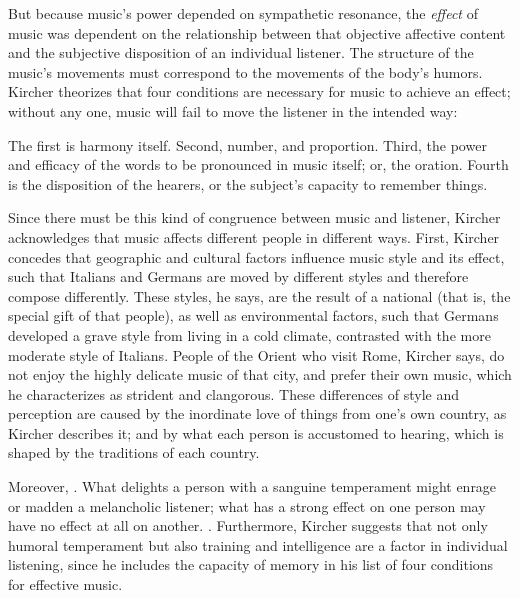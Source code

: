 But because music's power depended on sympathetic resonance, the \emph{effect}
of music was dependent on the relationship between that objective affective
content and the subjective disposition of an individual listener.
The structure of the music's movements must correspond to the movements of the
body's humors.
Kircher theorizes that four conditions are necessary for music to achieve an
effect; without any one, music will fail to move the listener in the intended
way:
\begin{quoting}
    The first is harmony itself. Second, number, and proportion. Third, the
    power and efficacy of the words to be pronounced in music itself; or, the
    oration.
    Fourth is the disposition of the hearers, or the subject's capacity to
    remember things.%
        \Autocite[550]{Kircher:Musurgia}
\end{quoting}
Since there must be this kind of congruence between music and listener, Kircher
acknowledges that music affects different people in different ways.
First, Kircher concedes that geographic and cultural factors influence music
style and its effect, such that Italians and Germans are moved by different
styles and therefore compose differently.
These styles, he says, are the result of a national  (that is,
the special gift of that people), as well as environmental factors, such that
Germans developed a grave style from living in a cold climate, contrasted with
the more moderate style of Italians.
People of the Orient who visit Rome, Kircher says, do not enjoy the highly
delicate music of that city, and prefer their own music, which he characterizes
as strident and clangorous.
These differences of style and perception are caused by the inordinate love of
things from one's own country, as Kircher describes it; and by what each person
is accustomed to hearing, which is shaped by the traditions of each country.%
    \Autocites
    [543--544]{Kircher:Musurgia}
    [see partial translation in][707--711]{Strunk:SRMH}

Moreover, .%
    \Autocite[544]{Kircher:Musurgia}
What delights a person with a sanguine temperament might enrage or madden a
melancholic listener; what has a strong effect on one person may have no effect
at all on another.%
    \Autocite[550]{Kircher:Musurgia}
.%
    \Autocite[550]{Kircher:Musurgia}
Furthermore, Kircher suggests that not only humoral temperament but also
training and intelligence are a factor in individual listening, since he
includes the capacity of memory in his list of four conditions for effective
music.

